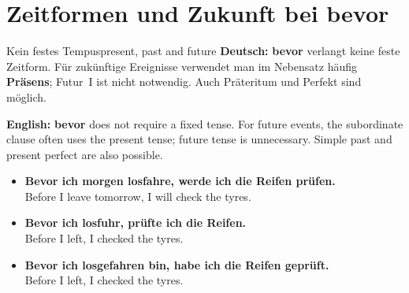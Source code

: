 \documentclass[a4paper,11pt]{article}
\newcommand{\GermanText}[1]{\textbf{Deutsch: }#1\par}
\newcommand{\EnglishText}[1]{{\small\color{SoftGray}\textbf{English: }#1\par}}
\newcommand{\ExampleItem}[2]{\item \textbf{#1}\\{\small\color{SoftGray}#2}}
\begin{document}
    \section{Zeitformen und Zukunft bei \glqq bevor\grqq}
        \begin{grammarentry}{Kein festes Tempus}{present, past and future}
            \GermanText{\textbf{bevor} verlangt keine feste Zeitform. Für zukünftige Ereignisse verwendet man im Nebensatz häufig \textbf{Präsens}; Futur~I ist nicht notwendig. Auch Präteritum und Perfekt sind möglich.}
            \EnglishText{\textbf{bevor} does not require a fixed tense. For future events, the subordinate clause often uses the present tense; future tense is unnecessary. Simple past and present perfect are also possible.}
        \end{grammarentry}
        \begin{exbox}
            \begin{itemize}
                \ExampleItem{Bevor ich morgen losfahre, werde ich die Reifen prüfen.}{Before I leave tomorrow, I will check the tyres.}
                \ExampleItem{Bevor ich losfuhr, prüfte ich die Reifen.}{Before I left, I checked the tyres.}
                \ExampleItem{Bevor ich losgefahren bin, habe ich die Reifen geprüft.}{Before I left, I checked the tyres.}
            \end{itemize}
        \end{exbox}
\end{document}
